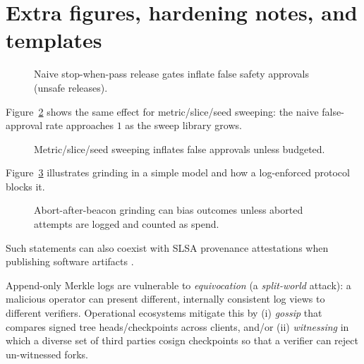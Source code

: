 \documentclass[11pt]{article}
\begin{document}
\section{Extra figures, hardening notes, and templates}

\begin{figure}[t]
\centering
{}
\caption{Naive stop-when-pass release gates inflate false safety approvals (unsafe releases).}
\label{fig:stop_when_pass}
\end{figure}

Figure~\ref{fig:sweep_grinding} shows the same effect for metric/slice/seed sweeping: the naive false-approval rate approaches $1$ as the sweep library grows.

\begin{figure}[t]
\centering
{}
\caption{Metric/slice/seed sweeping inflates false approvals unless budgeted.}
\label{fig:sweep_grinding}
\end{figure}

Figure~\ref{fig:abort} illustrates grinding in a simple model and how a log-enforced protocol blocks it.

\begin{figure}[t]
\centering
{}
\caption{Abort-after-beacon grinding can bias outcomes unless aborted attempts are logged and counted as spend.}
\label{fig:abort}
\end{figure}

Such statements can also coexist with SLSA provenance attestations when publishing software artifacts \cite{slsa_provenance_v1}.

Append-only Merkle logs are vulnerable to \emph{equivocation} (a \emph{split-world} attack): a malicious operator can present different, internally consistent log views to different verifiers.
Operational ecosystems mitigate this by (i) \emph{gossip} that compares signed tree heads/checkpoints across clients, and/or
(ii) \emph{witnessing} in which a diverse set of third parties cosign checkpoints so that a verifier can reject un-witnessed forks.
\end{document}
